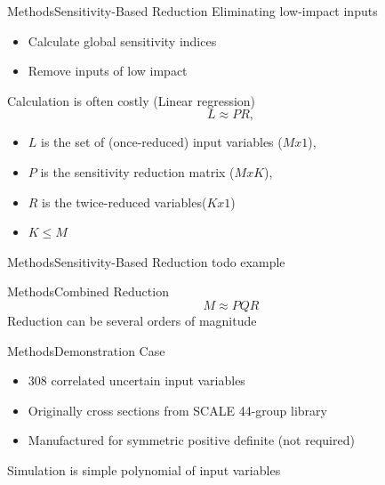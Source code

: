 \documentclass{beamer}
\begin{document}
\begin{frame}{Methods}{Sensitivity-Based Reduction}%
  Eliminating low-impact inputs
  \begin{itemize}
    \item Calculate global sensitivity indices
    \item Remove inputs of low impact
  \end{itemize}
  \vspace{10pt}
  Calculation is often costly (Linear regression)
  \begin{equation}
    L \approx P R,
  \end{equation}
  \begin{itemize}
    \item $L$ is the set of (once-reduced) input variables ($Mx1$),
    \item $P$ is the sensitivity reduction matrix ($MxK$),
    \item $R$ is the twice-reduced variables($Kx1$)
    \item $K \leq M$
  \end{itemize}
\end{frame}

\begin{frame}{Methods}{Sensitivity-Based Reduction}\vspace{-30pt}
  todo example
\end{frame}

\begin{frame}{Methods}{Combined Reduction}\vspace{-30pt}
  \begin{equation}
    M \approx P Q R
  \end{equation}
  \vspace{10pt}
  Reduction can be several orders of magnitude
\end{frame}


\begin{frame}{Methods}{Demonstration Case}\vspace{-30pt}
  \begin{itemize}
    \item 308 correlated uncertain input variables
    \item Originally cross sections from SCALE 44-group library
    \item Manufactured for symmetric positive definite (not required)
  \end{itemize}
  Simulation is simple polynomial of input variables
\end{frame}
\end{document}
